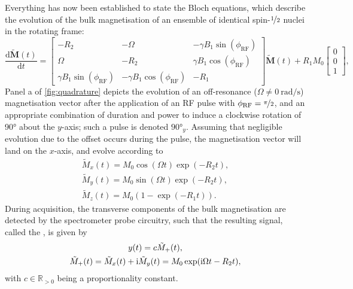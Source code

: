Everything has now been established to state the Bloch equations, which
describe the evolution of the bulk magnetisation of an ensemble of identical
spin-$\nicefrac{1}{2}$ nuclei in the rotating frame:
\begin{equation}
    \frac{\mathrm{d}\tilde{\symbf{M}}(t)}{\mathrm{d}t} =
    \begin{bmatrix}
        -R_2 & -\Omega & -\gamma B_1 \sin(\phi_{\text{RF}}) \\
        \Omega & -R_2 & \gamma B_1 \cos(\phi_{\text{RF}}) \\
        \gamma B_1 \sin(\phi_{\text{RF}}) & -\gamma B_1 \cos(\phi_{\text{RF}}) & -R_1
    \end{bmatrix}
    \tilde{\symbf{M}}(t)
    + R_1 M_0
    \begin{bmatrix}
        0 \\ 0 \\ 1
    \end{bmatrix},
\end{equation}
Panel a of \cref{fig:quadrature} depicts the
evolution of an off-resonance ($\Omega \neq \qty{0}{\radian\per\second}$)
magnetisation vector after the application of an
\ac{RF} pulse with $\phi_{\text{RF}} = \nicefrac{\pi}{2}$, and an appropriate
combination of duration and power to induce a clockwise rotation of \ang{90}
about the $y$-axis; such a pulse is denoted $\ang{90}_{y}$.
Assuming that negligible evolution due to the offset occurs during the pulse,
the magnetisation vector will land on the $x$-axis, and evolve according to
\begin{subequations}
    \begin{gather}
        \tilde{M}_x(t) = M_0 \cos(\Omega t) \exp(-R_2 t),\\
        \tilde{M}_y(t) = M_0 \sin(\Omega t) \exp(-R_2 t),\\
        \tilde{M}_z(t) = M_0 (1 - \exp(-R_1 t)).
    \end{gather}
\end{subequations}
During acquisition, the transverse components of the bulk magnetisation are
detected by the spectrometer probe circuitry, such that the resulting signal,
called the , is given by
\begin{subequations}
    \begin{gather}
        y(t) = c \tilde{M}_+(t),\\
        \tilde{M}_+(t) = \tilde{M}_x (t) + \mathrm{i} \tilde{M}_y (t) = M_0 \exp(\mathrm{i} \Omega t - R_2 t),
    \end{gather}
\end{subequations}
with $c \in \mathbb{R}_{>0}$ being a proportionality constant.


